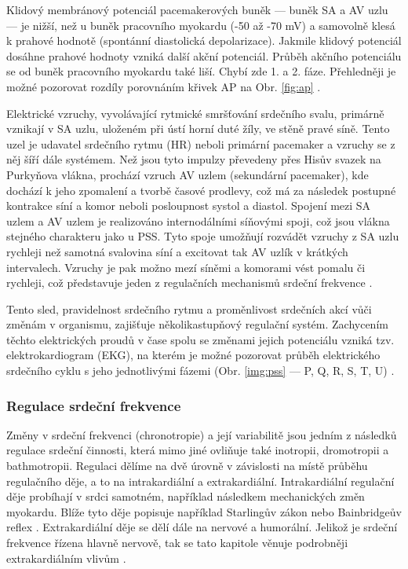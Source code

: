 Klidový membránový potenciál pacemakerových buněk --- buněk SA a AV uzlu --- je
nižší, než u buněk pracovního myokardu (-50 až -70 mV) a samovolně klesá k
prahové hodnotě (spontánní diastolická depolarizace). Jakmile klidový potenciál
dosáhne prahové hodnoty vzniká další akční potenciál. Průběh akčního potenciálu
se od buněk pracovního myokardu také liší. Chybí zde 1. a 2. fáze. Přehledněji
je možné pozorovat rozdíly porovnáním křivek AP na Obr. \ref{fig:ap}
\cite{Petrek2019}.

Elektrické vzruchy, vyvolávající rytmické smršťování srdečního svalu, primárně
vznikají v SA uzlu, uloženém při ústí horní duté žíly, ve stěně pravé síně.
Tento uzel je udavatel srdečního rytmu (HR) neboli primární pacemaker a vzruchy se z
něj šíří dále systémem. Než jsou tyto impulzy převedeny přes Hisův svazek na
Purkyňova vlákna, prochází vzruch AV uzlem (sekundární pacemaker), kde dochází k
jeho zpomalení a tvorbě časové prodlevy, což má za následek postupné kontrakce
síní a komor neboli posloupnost systol a diastol. Spojení mezi SA uzlem a AV
uzlem je realizováno internodálními síňovými spoji, což jsou vlákna stejného
charakteru jako u PSS. Tyto spoje umožňují rozvádět vzruchy z SA uzlu rychleji
než samotná svalovina síní a excitovat tak AV uzlík v krátkých intervalech.
Vzruchy je pak možno mezí síněmi a komorami vést pomalu či rychleji, což
představuje jeden z regulačních mechanismů srdeční frekvence
\cite{Dylevsky2013,Cihak2016}.

Tento sled, pravidelnost srdečního rytmu a proměnlivost srdečních akcí vůči
změnám v organismu, zajišťuje několikastupňový regulační systém. Zachycením
těchto elektrických proudů v čase spolu se změnami jejich potenciálu vzniká tzv.
elektrokardiogram (EKG), na kterém je možné pozorovat průběh elektrického
srdečního cyklu s jeho jednotlivými fázemi (Obr. \ref{img:pss} --- P, Q, R, S,
T, U) \cite{Dylevsky2013,Cihak2016}.


\subsubsection{Regulace srdeční frekvence}
\label{section:hr_regulation}
Změny v srdeční frekvenci (chronotropie) a její variabilitě jsou jedním z
následků regulace srdeční činnosti, která mimo jiné ovliňuje také inotropii,
dromotropii a bathmotropii. Regulaci dělíme na dvě úrovně v závislosti na místě
průběhu regulačního děje, a to na intrakardiální a extrakardiální.
Intrakardiální regulační děje probíhají v srdci samotném, například následkem
mechanických změn myokardu. Blíže tyto děje popisuje například Starlingův zákon
nebo Bainbridgeův reflex \cite{Kittnar2020}. Extrakardiální děje se dělí dále na
nervové a humorální. Jelikož je srdeční frekvence řízena hlavně nervově, tak se
tato kapitole věnuje podrobněji extrakardiálním vlivům \cite{Orel2019}.

